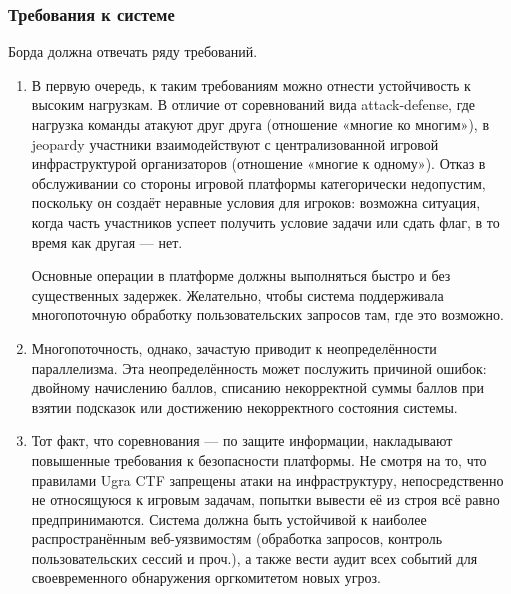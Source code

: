 

\subsubsection{Требования к системе}

Борда должна отвечать ряду требований.

\begin{enumerate}

\item
В первую очередь, к таким требованиям можно отнести устойчивость к высоким нагрузкам. В отличие от соревнований вида attack-defense, где нагрузка команды атакуют друг друга (отношение «многие ко многим»), в jeopardy участники взаимодействуют с централизованной игровой инфраструктурой организаторов (отношение «многие к одному»). Отказ в обслуживании со стороны игровой платформы категорически недопустим, поскольку он создаёт неравные условия для игроков: возможна ситуация, когда часть участников успеет получить условие задачи или сдать флаг, в то время как другая --- нет.

Основные операции в платформе должны выполняться быстро и без существенных задержек. Желательно, чтобы система поддерживала многопоточную обработку пользовательских запросов там, где это возможно.

\item
Многопоточность, однако, зачастую приводит к неопределённости параллелизма. Эта неопределённость может послужить причиной ошибок: двойному начислению баллов, списанию некорректной суммы баллов при взятии подсказок или достижению некорректного состояния системы.


\item
Тот факт, что соревнования --- по защите информации, накладывают повышенные требования к безопасности платформы. Не смотря на то, что правилами Ugra CTF запрещены атаки на инфраструктуру, непосредственно не относящуюся к игровым задачам, попытки вывести её из строя всё равно предпринимаются. Система должна быть устойчивой к наиболее распространённым веб-уязвимостям (обработка запросов, контроль пользовательских сессий и проч.), а также вести аудит всех событий для своевременного обнаружения оргкомитетом новых угроз.


\end{enumerate}
